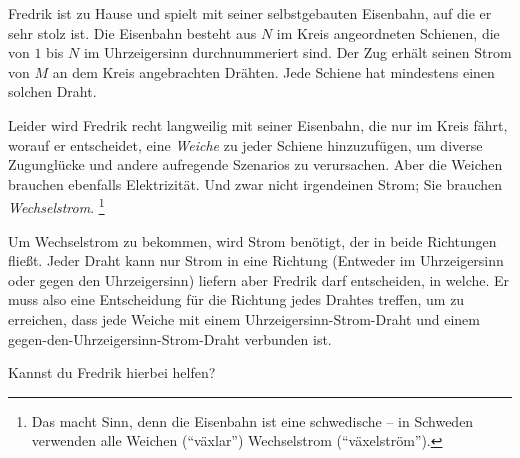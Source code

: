 \ifx\boi\undefined\fi
\def\version{jury-1}

Fredrik ist zu Hause und spielt mit seiner selbstgebauten Eisenbahn, auf die er sehr stolz ist. Die Eisenbahn besteht aus $N$ im Kreis angeordneten Schienen, die von $1$ bis $N$ im Uhrzeigersinn durchnummeriert sind. Der Zug erhält seinen Strom von $M$ an dem Kreis angebrachten Drähten. Jede Schiene hat mindestens einen solchen Draht.



Leider wird Fredrik recht langweilig mit seiner Eisenbahn, die nur im Kreis fährt, worauf er entscheidet, eine \emph{Weiche} zu jeder Schiene hinzuzufügen, um diverse Zugunglücke und andere aufregende Szenarios zu verursachen. Aber die Weichen brauchen ebenfalls Elektrizität. Und zwar nicht irgendeinen Strom; Sie brauchen \emph{Wechselstrom}. \footnote{Das macht Sinn, denn die Eisenbahn ist eine schwedische -- in Schweden verwenden alle Weichen (``växlar'') Wechselstrom (``växelström'').}






Um Wechselstrom zu bekommen, wird Strom benötigt, der in beide Richtungen fließt. Jeder Draht kann nur Strom in eine Richtung (Entweder im Uhrzeigersinn oder gegen den Uhrzeigersinn) liefern aber Fredrik darf entscheiden, in welche. Er muss also eine Entscheidung für die Richtung jedes Drahtes treffen, um zu erreichen, dass jede Weiche mit einem Uhrzeigersinn-Strom-Draht und einem gegen-den-Uhrzeigersinn-Strom-Draht verbunden ist.

Kannst du Fredrik hierbei helfen?

